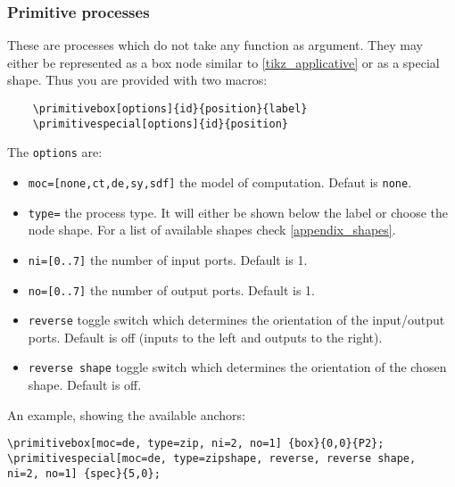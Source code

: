 \documentclass[10pt]{article}
\begin{document}
\subsubsection{Primitive processes}

These are processes which do not take any function as argument. They may either be represented as a box node similar to \autoref{tikz_applicative} or as a special shape. Thus you are provided with two macros:

\begin{verbatim}
	\primitivebox[options]{id}{position}{label}
	\primitivespecial[options]{id}{position}
\end{verbatim}

The \texttt{options} are:
\begin{itemize}
\item \texttt{moc=[none,ct,de,sy,sdf]} the model of computation. Defaut is \texttt{none}.
\item \texttt{type=} the process type. It will either be shown below the label or choose the node shape. For a list of available shapes check \autoref{appendix_shapes}.
\item \texttt{ni=[0..7]} the number of input ports. Default is 1.
\item \texttt{no=[0..7]} the number of output ports. Default is 1.
\item\texttt{reverse} toggle switch which determines the orientation of the input/output ports. Default is off (inputs to the left and outputs to the right).
\item\texttt{reverse shape} toggle switch which determines the orientation of the chosen shape. Default is off.
\end{itemize}

An example, showing the available anchors:
\begin{verbatim}
\primitivebox[moc=de, type=zip, ni=2, no=1] {box}{0,0}{P2};
\primitivespecial[moc=de, type=zipshape, reverse, reverse shape, 
ni=2, no=1] {spec}{5,0};
\end{verbatim}
\begin{figure}[htb!]\centering
{}
\end{figure}
\end{document}
